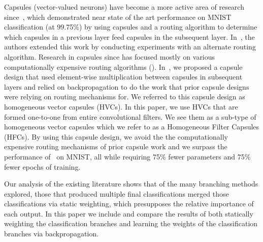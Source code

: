 \documentclass{article}
\begin{document}
Capsules (vector-valued neurons) have become a more active area of research since~\cite{Sabour2017}, which demonstrated near state of the art performance on MNIST~\cite{Lecun2010} classification (at 99.75\%) by using capsules and a routing algorithm to determine which capsules in a previous layer feed capsules in the subsequent layer.  In~\cite{Hinton2018}, the authors extended this work by conducting experiments with an alternate routing algorithm.  Research in capsules since has focused mostly on various computationally expensive routing algorithms (\cite{Venkataraman2020}\cite{Amer2020}).  In~\cite{Byerly2019}, we proposed a capsule design that used element-wise multiplication between capsules in subsequent layers and relied on backpropagation to do the work that prior capsule designs were relying on routing mechanisms for.  We referred to this capsule design as homogeneous vector capsules (HVCs).  In this paper, we use HVCs that are formed one-to-one from entire convolutional filters.  We see them as a sub-type of homogeneous vector capsules which we refer to as a Homogeneous Filter Capsules (HFCs).  By using this capsule design, we avoid the the computationally expensive routing mechanisms of prior capsule work and we surpass the performance of~\cite{Sabour2017} on MNIST, all while requiring 75\% fewer parameters and 75\% fewer epochs of training.

Our analysis of the existing literature shows that of the many branching methods explored, those that produced multiple final classifications merged those classifications via static weighting, which presupposes the relative importance of each output.  In this paper we include and compare the results of both statically weighting the classification branches and learning the weights of the classification branches via backpropagation.
\end{document}
